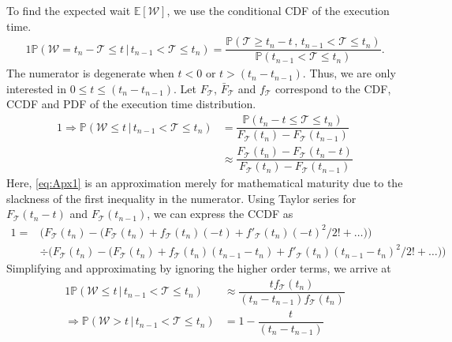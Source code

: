 To find  the expected wait  $\mathbb{E}[\mathcal{W}]$, we use the conditional \gls{CDF} of the execution time.
\begin{alignat}{1}
\mathbb{P}(\mathcal{W}=t_n-\mathcal{T}\leq t\,\big\vert\,t_{n-1}<\mathcal{T}\leq t_n)=\dfrac{\mathbb{P}(\mathcal{T}\geq t_n-t\,,\,t_{n-1}<\mathcal{T}\leq t_n)}{\mathbb{P}(t_{n-1}<\mathcal{T}\leq t_n)}.
\end{alignat}
The numerator is degenerate when $t\!<\!0$ or $t\!>\!(t_n\!-\!t_{n-1})$.
Thus, we are only interested in $0\!\leq\!t\!\leq\! (t_n-t_{n-1})$.
Let $F_{\mathcal{T}}$, $\bar{F}_{\mathcal{T}}$ and $f_{\mathcal{T}}$ correspond to the \gls{CDF}, \gls{CCDF} and \gls{PDF} of the execution time distribution.
\begin{alignat}{1}
\!\!\!\Rightarrow\mathbb{P}(\mathcal{W}\leq t\,\big\vert\,t_{n-1}<\mathcal{T}\leq t_n)&=\dfrac{\mathbb{P}(t_n-t\leq\mathcal{T}\leq t_n)}{F_\mathcal{T}(t_n)-F_\mathcal{T}(t_{n-1})}\nonumber\\
&\approx\dfrac{F_\mathcal{T}(t_n)-F_\mathcal{T}(t_{n}-t)}{F_\mathcal{T}(t_n)-F_\mathcal{T}(t_{n-1})}\label{eq:Apx1}
\end{alignat}
Here, \cref{eq:Apx1} is an approximation merely for mathematical maturity due to the slackness of the first inequality in the numerator.
Using Taylor series for $F_\mathcal{T}(t_{n}-t)$ and $F_\mathcal{T}(t_{n-1})$, we can express the \gls{CCDF} as
\begin{alignat}{1}
    =&\Big(F_\mathcal{T}(t_n)-\big(F_\mathcal{T}(t_n)+f_\mathcal{T}(t_n)(-t)+f'_\mathcal{T}(t_n)(-t)^2/2!+\dots\big)\Big)\nonumber\\
    &\div \Big(F_\mathcal{T}(t_n)-\big(F_\mathcal{T}(t_n)+f_\mathcal{T}(t_n)(t_{n-1}-t_n)+f'_\mathcal{T}(t_n)(t_{n-1}-t_n)^2/2!+\dots\big)\Big)\label{eq:ccdf}
\end{alignat}
Simplifying and approximating by ignoring the higher order terms, we arrive at
\begin{alignat}{1}
\mathbb{P}(\mathcal{W}\leq t\,\big\vert\,t_{n-1}<\mathcal{T}\leq t_n)&\approx\dfrac{tf_\mathcal{T}(t_n)}{(t_{n}-t_{n-1})f_\mathcal{T}(t_n)}\label{eq:Apx2}\\
\Rightarrow\mathbb{P}(\mathcal{W}> t\,|\,t_{n-1}<\mathcal{T}\leq t_n)&= 1-\dfrac{t}{(t_{n}-t_{n-1})}\nonumber
\end{alignat}

